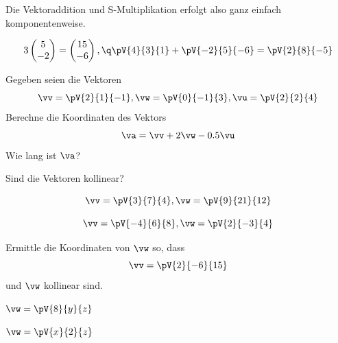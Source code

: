 \documentclass[%
11pt,%
twoside,%
titlepage,%
german,%
headsepline%
]{scrartcl}
\begin{document}
\begin{bem}
Die Vektoraddition und S-Multiplikation erfolgt also ganz einfach komponentenweise.
\end{bem}

\begin{bsps}
$$3\begin{pmatrix}5\\-2\end{pmatrix}=\begin{pmatrix}15\\-6\end{pmatrix},\q\pV{4}{3}{1}+\pV{-2}{5}{-6}=\pV{2}{8}{-5}$$
\end{bsps}

\begin{ueb}[Juhuu, 3D]
Gegeben seien die Vektoren
$$\vv=\pV{2}{1}{-1}, \vw=\pV{0}{-1}{3}, \vu=\pV{2}{2}{4}$$
Berechne die Koordinaten des Vektors
$$\va=\vv+2\vw-0.5\vu$$
Wie lang ist $\va$?
\end{ueb}

\begin{ueb}[parallel?]
Sind die Vektoren kollinear?

\begin{enumeratea}
\item $$\vv=\pV{3}{7}{4}, \vw=\pV{9}{21}{12}$$
\item $$\vv=\pV{-4}{6}{8}, \vw=\pV{2}{-3}{4}$$
\end{enumeratea}
\end{ueb}

\begin{ueb}
Ermittle die Koordinaten von $\vw$ so, dass
$$\vv=\pV{2}{-6}{15}$$
und $\vw$ kollinear sind.

\begin{minipage}{3.5cm}
\begin{enumeratea}
\item $\vw=\pV{8}{y}{z}$
\end{enumeratea}
\end{minipage}
\begin{minipage}{3.5cm}
\begin{enumeratea}
\addtocounter{enumi}{1}
\item $\vw=\pV{x}{2}{z}$
\end{enumeratea}
\end{minipage}
\end{ueb}
\end{document}
